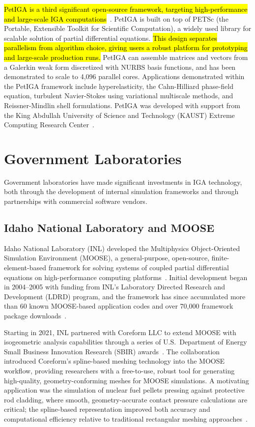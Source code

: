 \documentclass[12pt,report,justified]{SANDreport}
\begin{document}
\hl{PetIGA is a third significant open-source framework, targeting high-performance and large-scale IGA computations}~\cite{Dalcin2016PetIGA}.  PetIGA is built on top of PETSc (the Portable, Extensible Toolkit for Scientific Computation), a widely used library for scalable solution of partial differential equations.  \hl{This design separates parallelism from algorithm choice, giving users a robust platform for prototyping and large-scale production runs.}  PetIGA can assemble matrices and vectors from a Galerkin weak form discretized with NURBS basis functions, and has been demonstrated to scale to 4,096 parallel cores.  Applications demonstrated within the PetIGA framework include hyperelasticity, the Cahn-Hilliard phase-field equation, turbulent Navier-Stokes using variational multiscale methods, and Reissner-Mindlin shell formulations.  PetIGA was developed with support from the King Abdullah University of Science and Technology (KAUST) Extreme Computing Research Center~\cite{Dalcin2016PetIGA}.

\section{Government Laboratories}

Government laboratories have made significant investments in IGA technology, both through the development of internal simulation frameworks and through partnerships with commercial software vendors.

\subsection{Idaho National Laboratory and MOOSE}
\label{sec:moose}

Idaho National Laboratory (INL) developed the Multiphysics Object-Oriented Simulation Environment (MOOSE), a general-purpose, open-source, finite-element-based framework for solving systems of coupled partial differential equations on high-performance computing platforms~\cite{Martineau2021MOOSE}.  Initial development began in 2004--2005 with funding from INL's Laboratory Directed Research and Development (LDRD) program, and the framework has since accumulated more than 60 known MOOSE-based application codes and over 70,000 framework package downloads~\cite{Martineau2021MOOSE}.

Starting in 2021, INL partnered with Coreform LLC to extend MOOSE with isogeometric analysis capabilities through a series of U.S.\ Department of Energy Small Business Innovation Research (SBIR) awards~\cite{INLCoreformMOOSE2021}.  The collaboration introduced Coreform's spline-based meshing technology into the MOOSE workflow, providing researchers with a free-to-use, robust tool for generating high-quality, geometry-conforming meshes for MOOSE simulations.  A motivating application was the simulation of nuclear fuel pellets pressing against protective rod cladding, where smooth, geometry-accurate contact pressure calculations are critical; the spline-based representation improved both accuracy and computational efficiency relative to traditional rectangular meshing approaches~\cite{INLCoreformMOOSE2021}.
\end{document}
